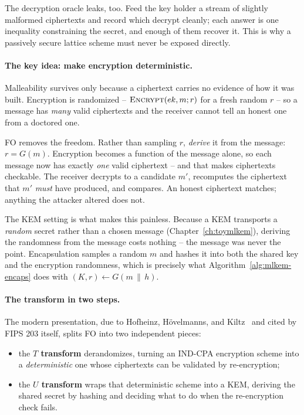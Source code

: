 The decryption oracle leaks, too. Feed the key holder a stream of slightly
malformed ciphertexts and record which decrypt cleanly; each answer is one
inequality constraining the secret, and enough of them recover it. This is why a
passively secure lattice scheme must never be exposed directly.

\paragraph{The key idea: make encryption deterministic.}
Malleability survives only because a ciphertext carries no evidence of how it
was built. Encryption is randomized -- $\textsc{Encrypt}(ek, m; r)$ for a fresh
random $r$ -- so a message has \emph{many} valid ciphertexts and the receiver
cannot tell an honest one from a doctored one.

FO removes the freedom. Rather than sampling $r$, \emph{derive} it from the
message: $r = G(m)$. Encryption becomes a function of the message alone, so each
message now has exactly \emph{one} valid ciphertext -- and that makes ciphertexts
checkable. The receiver decrypts to a candidate $m'$, recomputes the ciphertext
that $m'$ \emph{must} have produced, and compares. An honest ciphertext matches;
anything the attacker altered does not.

The KEM setting is what makes this painless. Because a KEM transports a
\emph{random} secret rather than a chosen message (Chapter~\ref{ch:toymlkem}),
deriving the randomness from the message costs nothing -- the message was never
the point. Encapsulation samples a random $m$ and hashes it into both the shared
key and the encryption randomness, which is precisely what
Algorithm~\ref{alg:mlkem-encaps} does with $(K, r) \gets G(m \,\|\, h)$.

\paragraph{The transform in two steps.}
The modern presentation, due to Hofheinz, H\"ovelmanns, and Kiltz~\cite{hhk2017}
and cited by FIPS 203 itself, splits FO into two independent pieces:

\begin{itemize}
  \item the \textbf{$T$ transform} derandomizes, turning an IND-CPA encryption
    scheme into a \emph{deterministic} one whose ciphertexts can be validated by
    re-encryption;
  \item the \textbf{$U$ transform} wraps that deterministic scheme into a KEM,
    deriving the shared secret by hashing and deciding what to do when the
    re-encryption check fails.
\end{itemize}

